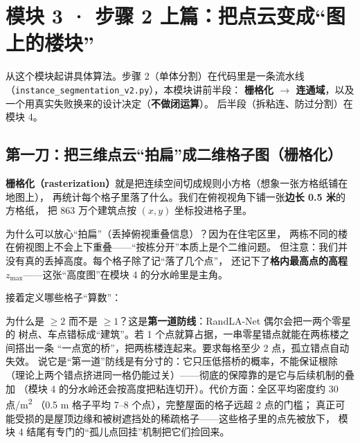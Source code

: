\section{模块 3 · 步骤 2 上篇：把点云变成``图上的楼块''}

从这个模块起讲具体算法。步骤 2（单体分割）在代码里是一条流水线
（\texttt{instance\_segmentation\_v2.py}），本模块讲前半段：
\textbf{栅格化 $\to$ 连通域}，以及一个用真实失败换来的设计决定（\textbf{不做闭运算}）。
后半段（拆粘连、防过分割）在模块 4。

\subsection{第一刀：把三维点云``拍扁''成二维格子图（栅格化）}

\textbf{栅格化（rasterization）}就是把连续空间切成规则小方格（想象一张方格纸铺在地图上），
再统计每个格子里落了什么。我们在俯视视角下铺一张\textbf{边长 0.5 米}的方格纸，
把 863 万个建筑点按 $(x,y)$ 坐标投进格子里。

为什么可以放心``拍扁''（丢掉俯视重叠信息）？因为在住宅区里，
两栋不同的楼在俯视图上不会上下重叠——``按栋分开''本质上是个二维问题。
但注意：我们并没有真的丢掉高度。每个格子除了记``落了几个点''，
还记下了\textbf{格内最高点的高程 $z_{\max}$}——这张``高度图''在模块 4 的分水岭里是主角。

接着定义哪些格子``算数''：

\begin{center}
\end{center}

为什么是 $\geq 2$ 而不是 $\geq 1$？这是\textbf{第一道防线}：RandLA-Net 偶尔会把一两个零星的
树点、车点错标成``建筑''。若 1 个点就算占据，一串零星错点就能在两栋楼之间搭出一条
``一点宽的桥''，把两栋楼连起来。要求每格至少 2 点，孤立错点自动失效。
说它是``第一道''防线是有分寸的：它只压低搭桥的概率，不能保证根除
（理论上两个错点挤进同一格仍能过关）——彻底的保障靠的是它与后续机制的叠加
（模块 4 的分水岭还会按高度把粘连切开）。代价方面：全区平均密度约 30 点/m\textsuperscript{2}
（0.5 m 格子平均 7--8 个点），完整屋面的格子远超 2 点的门槛；
真正可能受损的是屋顶边缘和被树遮挡处的稀疏格子——这些格子里的点先被放下，
模块 4 结尾有专门的``孤儿点回挂''机制把它们捡回来。

